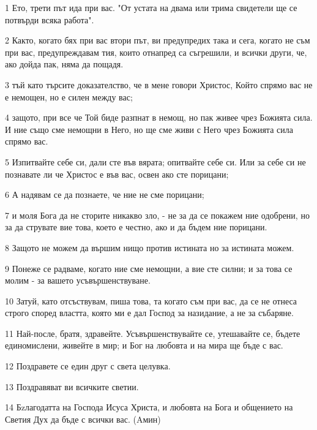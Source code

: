\par 1 Ето, трети път ида при вас. "От устата на двама или трима свидетели ще се потвърди всяка работа".
\par 2 Както, когато бях при вас втори път, ви предупредих така и сега, когато не съм при вас, предупреждавам тия, които отнапред са съгрешили, и всички други, че, ако дойда пак, няма да пощадя.
\par 3 тъй като търсите доказателство, че в мене говори Христос, Който спрямо вас не е немощен, но е силен между вас;
\par 4 защото, при все че Той биде разпнат в немощ, но пак живее чрез Божията сила. И ние също сме немощни в Него, но ще сме живи с Него чрез Божията сила спрямо вас.
\par 5 Изпитвайте себе си, дали сте във вярата; опитвайте себе си. Или за себе си не познавате ли че Христос е във вас, освен ако сте порицани;
\par 6 А надявам се да познаете, че ние не сме порицани;
\par 7 и моля Бога да не сторите никакво зло, - не за да се покажем ние одобрени, но за да струвате вие това, което е честно, ако и да бъдем ние порицани.
\par 8 Защото не можем да вършим нищо против истината но за истината можем.
\par 9 Понеже се радваме, когато ние сме немощни, а вие сте силни; и за това се молим - за вашето усъвършенствуване.
\par 10 Затуй, като отсъствувам, пиша това, та когато съм при вас, да се не отнеса строго според властта, която ми е дал Господ за назидание, а не за събаряне.
\par 11 Най-после, братя, здравейте. Усъвършенствувайте се, утешавайте се, бъдете единомислени, живейте в мир; и Бог на любовта и на мира ще бъде с вас.
\par 12 Поздравете се един друг с света целувка.
\par 13 Поздравяват ви всичките светии.
\par 14 Бzлагодатта на Господа Исуса Христа, и любовта на Бога и общението на Светия Дух да бъде с всички вас. (Aмин)


